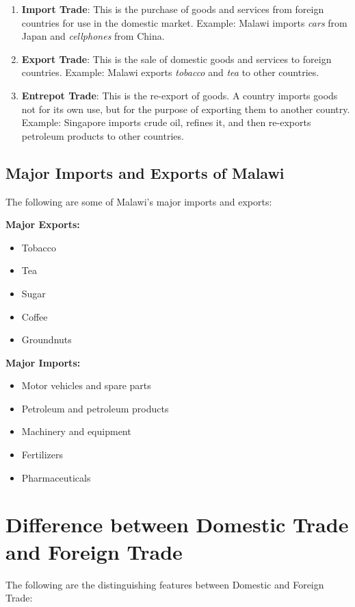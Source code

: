 \documentclass[12pt,a4paper, openany]{book}
\begin{document}
\begin{enumerate}
	\item \textbf{Import Trade}:
	      This is the purchase of goods and services from foreign countries for use in the domestic market.
	      Example: Malawi imports \textit{cars} from Japan and \textit{cellphones} from China.

	\item \textbf{Export Trade}:
	      This is the sale of domestic goods and services to foreign countries.
	      Example: Malawi exports \textit{tobacco} and \textit{tea} to other countries.

	\item \textbf{Entrepot Trade}:
	      This is the re-export of goods. A country imports goods not for its own use, but for the purpose of exporting them to another country.
	      Example: Singapore imports crude oil, refines it, and then re-exports petroleum products to other countries.
\end{enumerate}

\subsection{Major Imports and Exports of Malawi}
The following are some of Malawi’s major imports and exports:

\textbf{Major Exports:}
\begin{itemize}
	\item Tobacco
	\item Tea
	\item Sugar
	\item Coffee
	\item Groundnuts
\end{itemize}

\textbf{Major Imports:}
\begin{itemize}
	\item Motor vehicles and spare parts
	\item Petroleum and petroleum products
	\item Machinery and equipment
	\item Fertilizers
	\item Pharmaceuticals
\end{itemize}

\section{Difference between Domestic Trade and Foreign Trade}
The following are the distinguishing features between Domestic and Foreign Trade:
\end{document}
